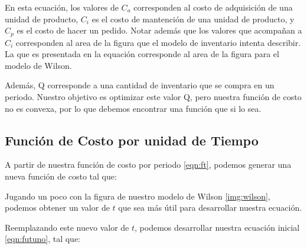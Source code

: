 En esta ecuación, los valores de $C_a$ corresponden al costo de adquisición de una unidad de producto, $C_i$ es el costo de mantención de una unidad de producto, y $C_p$ es el costo de hacer un pedido. Notar además que los valores que acompañan a $C_i$ corresponden al area de la figura que el modelo de inventario intenta describir. La que es presentada en la equación  corresponde al area de la figura para el modelo de Wilson.

Además, Q corresponde a una cantidad de inventario que se compra en un periodo. Nuestro objetivo es optimizar este valor Q, pero nuestra función de costo no es convexa, por lo que debemos encontrar una función que si lo sea.

\clearpage

\subsection{Función de Costo por unidad de Tiempo}

A partir de nuestra función de costo por periodo \ref{eqn:ft}, podemos generar una nueva función de costo tal que:


Jugando un poco con la figura de nuestro modelo de Wilson \ref{img:wilson}, podemos obtener un valor de $t$ que sea más útil para desarrollar nuestra ecuación.


Reemplazando este nuevo valor de $t$, podemos desarrollar nuestra ecuación inicial \ref{eqn:futuno}, tal que:


